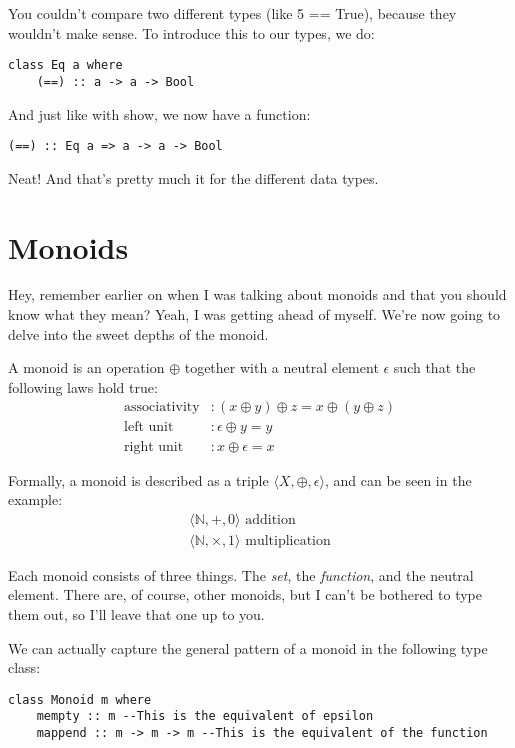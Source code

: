 \documentclass[11pt,a4paper,titlepage]{scrartcl}
\begin{document}
You couldn't compare two different types (like 5 == True), because they wouldn't
make sense. To introduce this to our types, we do:

\begin{lstlisting}
class Eq a where
    (==) :: a -> a -> Bool
\end{lstlisting}
And just like with show, we now have a function:
\begin{lstlisting}
(==) :: Eq a => a -> a -> Bool
\end{lstlisting}

Neat! And that's pretty much it for the different data types.

\section{Monoids}%
\label{sec:Monoids}
Hey, remember earlier on when I was talking about monoids and that you should
know what they mean? Yeah, I was getting ahead of myself. We're now going to
delve into the sweet depths of the monoid.

A monoid is an operation $\oplus$ together with a  neutral element
$\epsilon$ such that the following laws hold true:
\begin{align*}
    \text{associativity} &: (x \oplus y) \oplus z = x \oplus (y \oplus z) \\
    \text{left unit}  &: \epsilon \oplus y = y \\
    \text{right unit} &: x \oplus \epsilon = x
\end{align*}

Formally, a monoid is described as a triple $\langle X, \oplus, \epsilon
\rangle$, and can be seen in the example:
\begin{gather*}
    \langle \mathbb{N}, +, 0 \rangle \text{ addition} \\
    \langle \mathbb{N}, \times, 1 \rangle \text{ multiplication}
\end{gather*}

Each monoid consists of three things. The \textit{set}, the
\textit{function}, and the neutral element. There are, of course, other
monoids, but I can't be bothered to type them out, so I'll leave that one
up to you.

We can actually capture the general pattern of a monoid in the following
type class:
\begin{lstlisting}
class Monoid m where
    mempty :: m --This is the equivalent of epsilon
    mappend :: m -> m -> m --This is the equivalent of the function
\end{lstlisting}
\end{document}
